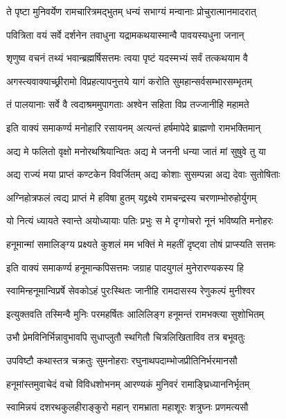 \twolineshloka
{ते पृष्टा मुनिवर्येण रामचारित्रमद्भुतम्}
{धन्यं सभाग्यं मन्वानाः प्रोचुरात्मानमादरात्}%


\twolineshloka
{पवित्रिता वयं सर्वे दर्शनेन तवाधुना}
{यद्रामकथयास्मान्वै पावयस्यधुना जनान्}%

\twolineshloka
{शृणुष्व वचनं तथ्यं भवान्ब्रह्मर्षिसत्तमः}
{त्वया पृष्टं यदस्मभ्यं सर्वं तत्कथयाम वै}%

\twolineshloka
{अगस्त्यवाक्याच्छ्रीरामो विप्रहत्यापनुत्तये}
{यागं करोति सुमहान्सर्वसम्भारसम्भृतम्}%

\twolineshloka
{तं पालयानाः सर्वे वै त्वदाश्रममुपागताः}
{अश्वेन सहिता विप्र तज्जानीहि महामते}%

\twolineshloka
{इति वाक्यं समाकर्ण्य मनोहारि रसायनम्}
{अत्यन्तं हर्षमापेदे ब्राह्मणो रामभक्तिमान्}%

\twolineshloka
{अद्य मे फलितो वृक्षो मनोरथश्रियान्वितः}
{अद्य मे जननी धन्या जातं मां सुषुवे तु या}%

\twolineshloka
{अद्य राज्यं मया प्राप्तं कण्टकेन विवर्जितम्}
{अद्य कोशाः सुसम्पन्ना अद्य देवाः सुतोषिताः}%

\twolineshloka
{अग्निहोत्रफलं त्वद्य प्राप्तं मे हविषा हुतम्}
{यद्द्रक्ष्ये रामचन्द्रस्य चरणाम्भोरुहोर्युगम्}%

\twolineshloka
{यो नित्यं ध्यायते स्वान्ते अयोध्यायाः पतिः प्रभुः}
{स मे दृग्गोचरो नूनं भविष्यति मनोहरः}%

\twolineshloka
{हनूमान्मां समालिङ्ग्य प्रक्ष्यते कुशलं मम}
{भक्तिं मे महतीं दृष्ट्वा तोषं प्राप्स्यति सत्तमः}%

\twolineshloka
{इति वाक्यं समाकर्ण्य हनूमान्कपिसत्तमः}
{जग्राह पादयुगलं मुनेरारण्यकस्य हि}%

\twolineshloka
{स्वामिन्हनूमान्विप्रर्षे सेवकोऽहं पुरःस्थितः}
{जानीहि रामदासस्य रेणुकल्पं मुनीश्वर}%

\twolineshloka
{इत्युक्तवति तस्मिन्वै मुनिः परमहर्षितः}
{आलिलिङ्ग हनूमन्तं रामभक्त्या सुशोभितम्}%

\twolineshloka
{उभौ प्रेमविनिर्भिन्नावुभावपि सुधाप्लुतौ}
{स्थगितौ चित्रलिखिताविव तत्र बभूवतुः}%

\twolineshloka
{उपविष्टौ कथास्तत्र चक्रतुः सुमनोहराः}
{रघुनाथपदाम्भोजप्रीतिनिर्भरमानसौ}%

\twolineshloka
{हनूमांस्तमुवाचेदं वचो विविधशोभनम्}
{आरण्यकं मुनिवरं रामाङ्घ्रिध्याननिर्भृतम्}%

\twolineshloka
{स्वामिन्नयं दशरथकुलहीराङ्कुरो महान्}
{रामभ्राता महाशूरः शत्रुघ्नः प्रणमत्यसौ}%

